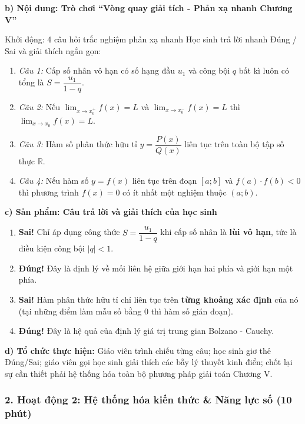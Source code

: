 \documentclass[12pt, a4paper]{article}
\begin{document}
\noindent \textbf{b) Nội dung: Trò chơi ``Vòng quay giải tích - Phản xạ nhanh Chương V''}
\begin{pedabox}{Khởi động: 4 câu hỏi trắc nghiệm phản xạ nhanh}
Học sinh trả lời nhanh Đúng / Sai và giải thích ngắn gọn:
\begin{enumerate}[leftmargin=0.6cm]
    \item \textit{Câu 1:} Cấp số nhân vô hạn có số hạng đầu $u_1$ và công bội $q$ bất kì luôn có tổng là $S = \dfrac{u_1}{1 - q}$.
    \item \textit{Câu 2:} Nếu $\lim_{x \to x_0^+} f(x) = L$ và $\lim_{x \to x_0^-} f(x) = L$ thì $\lim_{x \to x_0} f(x) = L$.
    \item \textit{Câu 3:} Hàm số phân thức hữu tỉ $y = \dfrac{P(x)}{Q(x)}$ liên tục trên toàn bộ tập số thực $\mathbb{R}$.
    \item \textit{Câu 4:} Nếu hàm số $y = f(x)$ liên tục trên đoạn $[a; b]$ và $f(a) \cdot f(b) < 0$ thì phương trình $f(x) = 0$ có ít nhất một nghiệm thuộc $(a; b)$.
\end{enumerate}
\end{pedabox}

\noindent \textbf{c) Sản phẩm: Câu trả lời và giải thích của học sinh}
\begin{enumerate}[leftmargin=0.6cm]
    \item \textbf{Sai!} Chỉ áp dụng công thức $S = \dfrac{u_1}{1 - q}$ khi cấp số nhân là \textbf{lùi vô hạn}, tức là điều kiện công bội $|q| < 1$.
    \item \textbf{Đúng!} Đây là định lý về mối liên hệ giữa giới hạn hai phía và giới hạn một phía.
    \item \textbf{Sai!} Hàm phân thức hữu tỉ chỉ liên tục trên \textbf{từng khoảng xác định} của nó (tại những điểm làm mẫu số bằng 0 thì hàm số gián đoạn).
    \item \textbf{Đúng!} Đây là hệ quả của định lý giá trị trung gian Bolzano - Cauchy.
\end{enumerate}

\noindent \textbf{d) Tổ chức thực hiện:}
Giáo viên trình chiếu từng câu; học sinh giơ thẻ Đúng/Sai; giáo viên gọi học sinh giải thích các bẫy lý thuyết kinh điển; chốt lại sự cần thiết phải hệ thống hóa toàn bộ phương pháp giải toán Chương V.

\subsubsection*{2. Hoạt động 2: Hệ thống hóa kiến thức \& Năng lực số (10 phút)}
\end{document}
